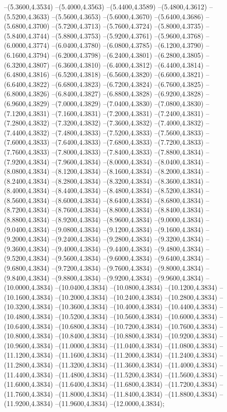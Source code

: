 {	--(5.3600,4.3534)
	--(5.4000,4.3563)
	--(5.4400,4.3589)
	--(5.4800,4.3612)
	--(5.5200,4.3633)
	--(5.5600,4.3653)
	--(5.6000,4.3670)
	--(5.6400,4.3686)
	--(5.6800,4.3700)
	--(5.7200,4.3713)
	--(5.7600,4.3724)
	--(5.8000,4.3735)
	--(5.8400,4.3744)
	--(5.8800,4.3753)
	--(5.9200,4.3761)
	--(5.9600,4.3768)
	--(6.0000,4.3774)
	--(6.0400,4.3780)
	--(6.0800,4.3785)
	--(6.1200,4.3790)
	--(6.1600,4.3794)
	--(6.2000,4.3798)
	--(6.2400,4.3801)
	--(6.2800,4.3805)
	--(6.3200,4.3807)
	--(6.3600,4.3810)
	--(6.4000,4.3812)
	--(6.4400,4.3814)
	--(6.4800,4.3816)
	--(6.5200,4.3818)
	--(6.5600,4.3820)
	--(6.6000,4.3821)
	--(6.6400,4.3822)
	--(6.6800,4.3823)
	--(6.7200,4.3824)
	--(6.7600,4.3825)
	--(6.8000,4.3826)
	--(6.8400,4.3827)
	--(6.8800,4.3828)
	--(6.9200,4.3828)
	--(6.9600,4.3829)
	--(7.0000,4.3829)
	--(7.0400,4.3830)
	--(7.0800,4.3830)
	--(7.1200,4.3831)
	--(7.1600,4.3831)
	--(7.2000,4.3831)
	--(7.2400,4.3831)
	--(7.2800,4.3832)
	--(7.3200,4.3832)
	--(7.3600,4.3832)
	--(7.4000,4.3832)
	--(7.4400,4.3832)
	--(7.4800,4.3833)
	--(7.5200,4.3833)
	--(7.5600,4.3833)
	--(7.6000,4.3833)
	--(7.6400,4.3833)
	--(7.6800,4.3833)
	--(7.7200,4.3833)
	--(7.7600,4.3833)
	--(7.8000,4.3833)
	--(7.8400,4.3833)
	--(7.8800,4.3834)
	--(7.9200,4.3834)
	--(7.9600,4.3834)
	--(8.0000,4.3834)
	--(8.0400,4.3834)
	--(8.0800,4.3834)
	--(8.1200,4.3834)
	--(8.1600,4.3834)
	--(8.2000,4.3834)
	--(8.2400,4.3834)
	--(8.2800,4.3834)
	--(8.3200,4.3834)
	--(8.3600,4.3834)
	--(8.4000,4.3834)
	--(8.4400,4.3834)
	--(8.4800,4.3834)
	--(8.5200,4.3834)
	--(8.5600,4.3834)
	--(8.6000,4.3834)
	--(8.6400,4.3834)
	--(8.6800,4.3834)
	--(8.7200,4.3834)
	--(8.7600,4.3834)
	--(8.8000,4.3834)
	--(8.8400,4.3834)
	--(8.8800,4.3834)
	--(8.9200,4.3834)
	--(8.9600,4.3834)
	--(9.0000,4.3834)
	--(9.0400,4.3834)
	--(9.0800,4.3834)
	--(9.1200,4.3834)
	--(9.1600,4.3834)
	--(9.2000,4.3834)
	--(9.2400,4.3834)
	--(9.2800,4.3834)
	--(9.3200,4.3834)
	--(9.3600,4.3834)
	--(9.4000,4.3834)
	--(9.4400,4.3834)
	--(9.4800,4.3834)
	--(9.5200,4.3834)
	--(9.5600,4.3834)
	--(9.6000,4.3834)
	--(9.6400,4.3834)
	--(9.6800,4.3834)
	--(9.7200,4.3834)
	--(9.7600,4.3834)
	--(9.8000,4.3834)
	--(9.8400,4.3834)
	--(9.8800,4.3834)
	--(9.9200,4.3834)
	--(9.9600,4.3834)
	--(10.0000,4.3834)
	--(10.0400,4.3834)
	--(10.0800,4.3834)
	--(10.1200,4.3834)
	--(10.1600,4.3834)
	--(10.2000,4.3834)
	--(10.2400,4.3834)
	--(10.2800,4.3834)
	--(10.3200,4.3834)
	--(10.3600,4.3834)
	--(10.4000,4.3834)
	--(10.4400,4.3834)
	--(10.4800,4.3834)
	--(10.5200,4.3834)
	--(10.5600,4.3834)
	--(10.6000,4.3834)
	--(10.6400,4.3834)
	--(10.6800,4.3834)
	--(10.7200,4.3834)
	--(10.7600,4.3834)
	--(10.8000,4.3834)
	--(10.8400,4.3834)
	--(10.8800,4.3834)
	--(10.9200,4.3834)
	--(10.9600,4.3834)
	--(11.0000,4.3834)
	--(11.0400,4.3834)
	--(11.0800,4.3834)
	--(11.1200,4.3834)
	--(11.1600,4.3834)
	--(11.2000,4.3834)
	--(11.2400,4.3834)
	--(11.2800,4.3834)
	--(11.3200,4.3834)
	--(11.3600,4.3834)
	--(11.4000,4.3834)
	--(11.4400,4.3834)
	--(11.4800,4.3834)
	--(11.5200,4.3834)
	--(11.5600,4.3834)
	--(11.6000,4.3834)
	--(11.6400,4.3834)
	--(11.6800,4.3834)
	--(11.7200,4.3834)
	--(11.7600,4.3834)
	--(11.8000,4.3834)
	--(11.8400,4.3834)
	--(11.8800,4.3834)
	--(11.9200,4.3834)
	--(11.9600,4.3834)
	--(12.0000,4.3834);
}
